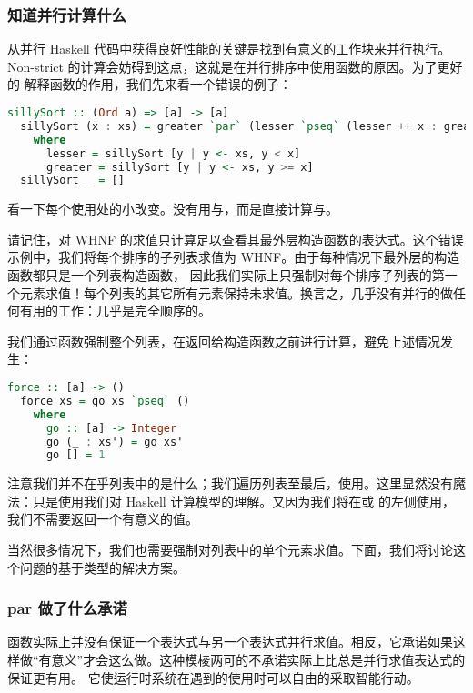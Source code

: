 \documentclass[./main.tex]{subfiles}
\begin{document}
\subsubsection*{知道并行计算什么}

从并行 Haskell 代码中获得良好性能的关键是找到有意义的工作块来并行执行。Non-strict 的计算会妨碍到这点，这就是在并行排序中使用函数的原因。为了更好的
解释函数的作用，我们先来看一个错误的例子：

\begin{lstlisting}[language=Haskell]
  sillySort :: (Ord a) => [a] -> [a]
  sillySort (x : xs) = greater `par` (lesser `pseq` (lesser ++ x : greater))
    where
      lesser = sillySort [y | y <- xs, y < x]
      greater = sillySort [y | y <- xs, y >= x]
  sillySort _ = []
\end{lstlisting}

看一下每个使用处的小改变。没有用与，而是直接计算与。

请记住，对 WHNF 的求值只计算足以查看其最外层构造函数的表达式。这个错误示例中，我们将每个排序的子列表求值为 WHNF。由于每种情况下最外层的构造函数都只是一个列表构造函数，
因此我们实际上只强制对每个排序子列表的第一个元素求值！每个列表的其它所有元素保持未求值。换言之，几乎没有并行的做任何有用的工作：几乎是完全顺序的。

我们通过函数强制整个列表，在返回给构造函数之前进行计算，避免上述情况发生：

\begin{lstlisting}[language=Haskell]
  force :: [a] -> ()
  force xs = go xs `pseq` ()
    where
      go :: [a] -> Integer
      go (_ : xs') = go xs'
      go [] = 1
\end{lstlisting}

注意我们并不在乎列表中的是什么；我们遍历列表至最后，使用。这里显然没有魔法：只是使用我们对 Haskell 计算模型的理解。又因为我们将在或
的左侧使用，我们不需要返回一个有意义的值。

当然很多情况下，我们也需要强制对列表中的单个元素求值。下面，我们将讨论这个问题的基于类型的解决方案。

\subsubsection*{par 做了什么承诺}

函数实际上并没有保证一个表达式与另一个表达式并行求值。相反，它承诺如果这样做“有意义”才会这么做。这种模棱两可的不承诺实际上比总是并行求值表达式的保证更有用。
它使运行时系统在遇到的使用时可以自由的采取智能行动。
\end{document}
